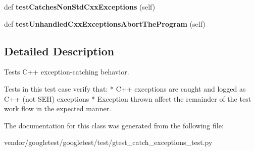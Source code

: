 \begin{DoxyCompactItemize}
\item 
def {\bfseries test\+Catches\+Non\+Std\+Cxx\+Exceptions} (self)\hypertarget{classgtest__catch__exceptions__test_1_1CatchCxxExceptionsTest_a922cb0b598034924c19e6695cc9f7513}{}\label{classgtest__catch__exceptions__test_1_1CatchCxxExceptionsTest_a922cb0b598034924c19e6695cc9f7513}

\item 
def {\bfseries test\+Unhandled\+Cxx\+Exceptions\+Abort\+The\+Program} (self)\hypertarget{classgtest__catch__exceptions__test_1_1CatchCxxExceptionsTest_af3a794d5af0b3d72789293531468050a}{}\label{classgtest__catch__exceptions__test_1_1CatchCxxExceptionsTest_af3a794d5af0b3d72789293531468050a}

\end{DoxyCompactItemize}


\subsection{Detailed Description}
\begin{DoxyVerb}Tests C++ exception-catching behavior.

   Tests in this test case verify that:
   * C++ exceptions are caught and logged as C++ (not SEH) exceptions
   * Exception thrown affect the remainder of the test work flow in the
     expected manner.
\end{DoxyVerb}
 

The documentation for this class was generated from the following file\+:\begin{DoxyCompactItemize}
\item 
vendor/googletest/googletest/test/gtest\+\_\+catch\+\_\+exceptions\+\_\+test.\+py\end{DoxyCompactItemize}

